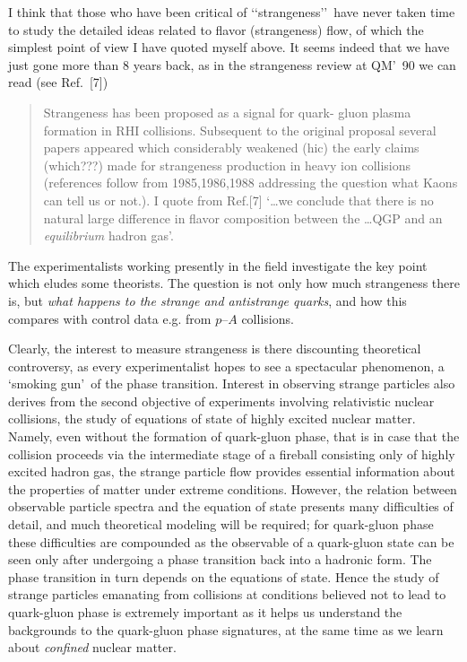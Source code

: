 \begin{mdframed}[linecolor=gray,roundcorner=12pt,backgroundcolor=Dandelion!15,linewidth=1pt,leftmargin=0cm,rightmargin=0cm,topline=true,bottomline=true,skipabove=12pt]
I think that those who have been critical of \lq\lq strangeness\rq\rq\ have never taken time to study the detailed ideas related to flavor (strangeness) flow, of which the simplest point of view I have quoted myself above. It seems indeed that we have just gone more than 8 years back, as in the strangeness review at QM\rq\ 90 we can read (see Ref.\, [7]) 
\begin{quote}
Strangeness has been proposed as a signal for quark- gluon plasma formation in RHI collisions. Subsequent to the original proposal several papers appeared which considerably weakened (hic) the early claims (which???) made for strangeness production in heavy ion collisions (references follow from 1985,1986,1988 addressing the question what Kaons can tell us or not.).  I  quote from Ref.[7]  \lq \ldots we conclude that there is no natural large difference in flavor composition between the \ldots QGP and an {\it equilibrium} hadron gas\rq. 
\end{quote} 
The experimentalists working presently in the field investigate the key point which eludes some theorists\footnotemark[8]. The question is not only how much strangeness there is, but {\it what happens to the strange and antistrange quarks}, and how this compares with control data e.g. from $p$--$A$ collisions.

Clearly, the interest to measure strangeness is there  discounting   theoretical controversy, as every experimentalist hopes to see a spectacular phenomenon, a \lq smoking gun\rq\ of the phase transition. Interest in observing strange particles also derives from the second objective of experiments involving relativistic nuclear collisions, the study of equations of state of highly excited nuclear matter. Namely, even without the formation of quark-gluon phase, that is in case that the collision proceeds via the intermediate stage of a fireball consisting only of highly excited hadron gas, the strange particle flow provides essential information about the properties of matter under extreme conditions. However, the relation between observable particle spectra and the equation of state presents many difficulties of detail, and much theoretical modeling will be required; for quark-gluon phase these difficulties are compounded as the observable of a quark-gluon state can be seen only after undergoing a phase transition back into a hadronic form. The phase transition in turn depends on the equations of state. Hence the study of strange particles emanating from collisions at conditions believed not to lead to quark-gluon phase is extremely important as it helps us understand the backgrounds to the quark-gluon phase signatures, at the same time as we learn about {\em confined} nuclear matter.  


\end{mdframed}
